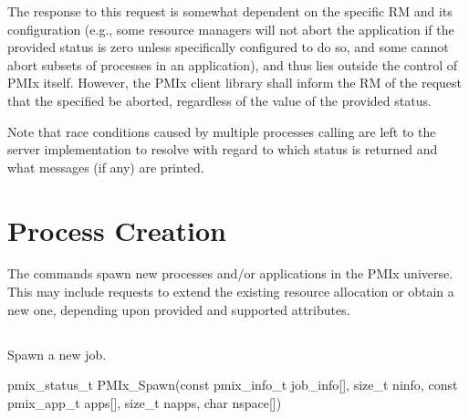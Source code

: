 \adviceuserstart
The response to this request is somewhat dependent on the specific \acl{RM} and its configuration (e.g., some resource managers will not abort the application if the provided status is zero unless specifically configured to do so, and some cannot abort subsets of processes in an application), and thus lies outside the control of PMIx itself.
However, the PMIx client library shall inform the \ac{RM} of the request that the specified  be aborted, regardless of the value of the provided status.

Note that race conditions caused by multiple processes calling  are left to the server implementation to resolve with regard to which status is returned and what messages (if any) are printed.
\adviceuserend


\section{Process Creation}
\label{chap:api_proc_mgmt:spawn}

The  commands spawn new processes and/or applications in the \ac{PMIx} universe. This may include requests to extend the existing resource allocation or obtain a new one, depending upon provided and supported attributes.

\subsection{}

\summary

Spawn a new job.

\format

\cspecificstart
\begin{codepar}
pmix_status_t
PMIx_Spawn(const pmix_info_t job_info[], size_t ninfo,
           const pmix_app_t apps[], size_t napps,
           char nspace[])
\end{codepar}
\cspecificend

\begin{arglist}
\end{arglist}

